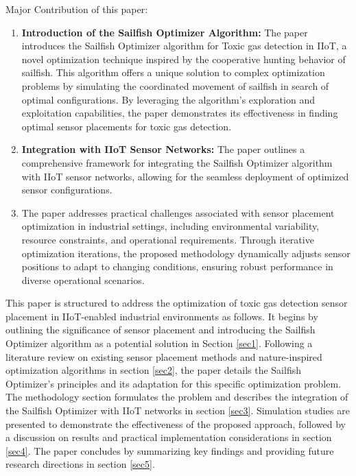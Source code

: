 \documentclass[conference]{IEEEtran}
\begin{document}
Major Contribution of this paper:
\begin{enumerate}
\item \textbf{Introduction of the Sailfish Optimizer Algorithm: }The paper introduces the Sailfish Optimizer algorithm for Toxic gas detection in IIoT, a novel optimization technique inspired by the cooperative hunting behavior of sailfish. This algorithm offers a unique solution to complex optimization problems by simulating the coordinated movement of sailfish in search of optimal configurations. By leveraging the algorithm's exploration and exploitation capabilities, the paper demonstrates its effectiveness in finding optimal sensor placements for toxic gas detection.

\item \textbf{Integration with IIoT Sensor Networks: }The paper outlines a comprehensive framework for integrating the Sailfish Optimizer algorithm with IIoT sensor networks, allowing for the seamless deployment of optimized sensor configurations. 

\item The paper addresses practical challenges associated with sensor placement optimization in industrial settings, including environmental variability, resource constraints, and operational requirements. Through iterative optimization iterations, the proposed methodology dynamically adjusts sensor positions to adapt to changing conditions, ensuring robust performance in diverse operational scenarios.
\end{enumerate}

This paper is structured to address the optimization of toxic gas detection sensor placement in IIoT-enabled industrial environments as follows. It begins by outlining the significance of sensor placement and introducing the Sailfish Optimizer algorithm as a potential solution in Section \ref{sec1}. Following a literature review on existing sensor placement methods and nature-inspired optimization algorithms in section \ref{sec2}, the paper details the Sailfish Optimizer's principles and its adaptation for this specific optimization problem. The methodology section formulates the problem and describes the integration of the Sailfish Optimizer with IIoT networks in section \ref{sec3}. Simulation studies are presented to demonstrate the effectiveness of the proposed approach, followed by a discussion on results and practical implementation considerations in section \ref{sec4}. The paper concludes by summarizing key findings and providing future research directions in section \ref{sec5}.
\end{document}
